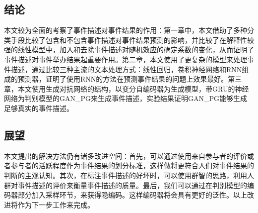 % 
\subsection{结论}
本文较为全面的考察了事件描述对事件结果的作用：第一章中，本文借助了多种分类手段比较了包含和不包含事件描述对事件结果预测的影响，并比较了在解释性较强的线性模型中，加入和去除事件描述对随机效应的确定系数的变化，从而证明了事件描述对事件举办结果起重要作用。第二章，本文使用了更复杂的模型来处理事件描述，通过比较三种主流的文本处理方式：线性回归，卷积神经网络和RNN组成的预测器，证明了使用RNN的方法在预测事件结果的问题上效果最好。第三章，本文使用生成对抗网络的结构，以变分自编码器为生成模型，带GRU的神经网络为判别模型的GAN\_PG来生成事件描述，实验结果证明GAN\_PG能够生成足够真实的事件描述。
\subsection{展望}
本文提出的解决方法仍有诸多改进空间：首先，可以通过使用来自参与者的评价或者参与者的活跃程度作为事件结果的划分标准，这样做将更符合人们对事件结果的判断的主观认知。其次，在标注事件描述的好坏时，可以使用群智的思路，利用人群对事件描述的评价来衡量事件描述的质量。最后，我们可以通过在判别模型的编码器部分加入采样环节，来获得隐编码。这样编码器将会具有更好的泛性。以上改进将作为下一步工作来完成。
% 
